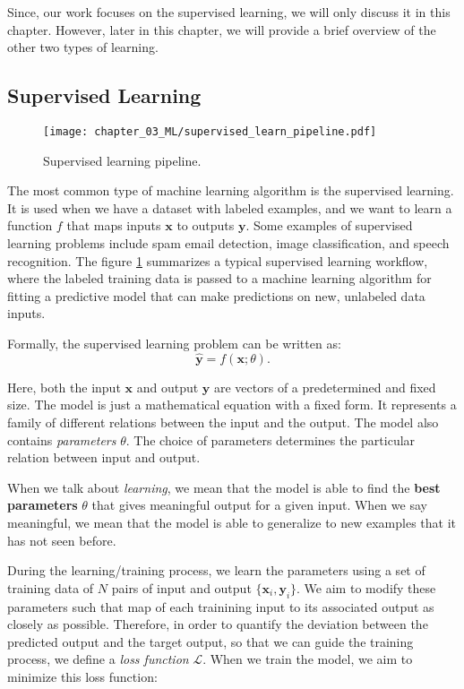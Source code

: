 Since, our work focuses on the supervised learning, we will only discuss it in this chapter. However, later in this chapter, we will provide a brief overview of the other two types of learning.

\subsection{Supervised Learning}

\begin{figure}[t]
    \centering
    \texttt{[image: chapter\_03\_ML/supervised\_learn\_pipeline.pdf]} %
    \caption{Supervised learning pipeline.}
    \label{fig:ml_pipeline_basic}
\end{figure}

The most common type of machine learning algorithm is the supervised learning. It is used when we have a dataset with labeled examples, and we want to learn a function $f$ that maps inputs $\textbf{x}$ to outputs $\textbf{y}$. Some examples of supervised learning problems include spam email detection, image classification, and speech recognition. The figure \ref{fig:ml_pipeline_basic} summarizes a typical supervised learning workflow, where the labeled training data is passed to a machine learning algorithm for fitting a predictive model that can make predictions on new, unlabeled data inputs.

Formally, the supervised learning problem can be written as:
\begin{equation}
    \label{eq:supervised_learning}
    \hat{\textbf{y}} = f(\textbf{x}; \theta).
\end{equation}

Here, both the input $\textbf{x}$ and output $\textbf{y}$ are vectors of a predetermined and fixed size. The model is just a mathematical equation with a fixed form. It represents a family of different relations between the input and the output. The model also contains \textit{parameters} $\theta$. The choice of parameters determines the particular relation between input and output.

When we talk about \textit{learning}, we mean that the model is able to find the \textbf{best parameters} $\theta$ that gives meaningful output for a given input. When we say meaningful, we mean that the model is able to generalize to new examples that it has not seen before. 

During the learning/training process, we learn the parameters using a set of training data of $N$ pairs of input and output $\{\textbf{x}_i, \textbf{y}_i\}$. We aim to modify these parameters such that map of each trainining input to its associated output as closely as possible. Therefore, in order to quantify the deviation between the predicted output and the target output, so that we can guide the training process, we define a \textit{loss function} $\mathcal{L}$. When we train the model, we aim to minimize this loss function:

